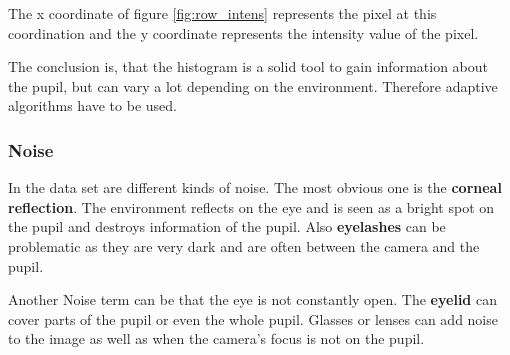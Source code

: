     The x coordinate of figure \ref{fig:row_intens} represents the pixel at this coordination and the y coordinate represents the intensity value of the pixel. 

    The conclusion is, that the histogram is a solid tool to gain information about the pupil, but can vary a lot depending on the environment. Therefore adaptive algorithms have to be used. 
    
    \subsubsection{Noise}
      In the data set are different kinds of noise. The most obvious one is the \textbf{corneal reflection}. The environment reflects on the eye and is seen as a bright spot on the pupil and destroys information of the pupil. Also \textbf{eyelashes} can be problematic as they are very dark and are often between the camera and the pupil. 

      Another Noise term can be that the eye is not constantly open. The \textbf{eyelid} can cover parts of the pupil or even the whole pupil. Glasses or lenses can add noise to the image as well as when the camera's focus is not on the pupil.